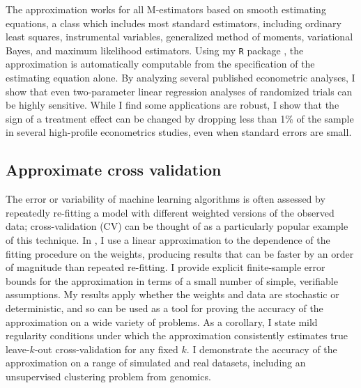 The approximation works for all M-estimators based on smooth estimating
equations, a class which includes most standard estimators, including ordinary
least squares, instrumental variables, generalized method of moments,
variational Bayes, and maximum likelihood estimators. Using my \texttt{R}
package \citep{zaminfluence}, the approximation is automatically computable from
the specification of the estimating equation alone.  By analyzing several
published econometric analyses,
I show that even two-parameter linear regression analyses of randomized trials
can be highly sensitive.  While I find some applications are robust, I show that
the sign of a treatment effect can be changed by dropping less than 1\% of the
sample in  several high-profile econometrics studies, even when standard errors
are small.


\subsection{Approximate cross validation}
%
The error or variability of machine learning algorithms is often assessed by
repeatedly re-fitting a model with different weighted versions of the observed
data; cross-validation (CV) can be thought of as a particularly popular example
of this technique.
%
In \citet{giordano:2019:ij}, I use a linear approximation to the dependence of
the fitting procedure on the weights, producing results that can be faster by an
order of magnitude than repeated re-fitting. I provide explicit finite-sample
error bounds for the approximation in terms of a small number of simple,
verifiable assumptions.  My results apply whether the weights and data are
stochastic or deterministic, and so can be used as a tool for proving the
accuracy of the approximation on a wide variety of problems. As a
corollary, I state mild regularity conditions under which the approximation
consistently estimates true leave-$k$-out cross-validation for any fixed $k$. I
demonstrate the accuracy of the approximation on a range of simulated and real
datasets, including an unsupervised clustering problem from genomics.


